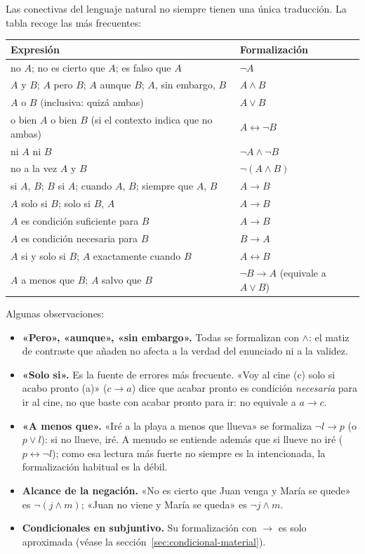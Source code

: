 Las conectivas del lenguaje natural no siempre tienen una única traducción. La tabla recoge las más frecuentes:
\begin{center}
\renewcommand{\arraystretch}{1.25}
\begin{tabular}{|p{9cm}|l|}
\hline
\textbf{Expresión} & \textbf{Formalización} \\
\hline
no $A$; no es cierto que $A$; es falso que $A$ & $\neg A$ \\
$A$ y $B$; $A$ pero $B$; $A$ aunque $B$; $A$, sin embargo, $B$ & $A \land B$ \\
$A$ o $B$ (inclusiva: quizá ambas) & $A \lor B$ \\
o bien $A$ o bien $B$ (si el contexto indica que no ambas) & $A \leftrightarrow \lnot B$ \\
ni $A$ ni $B$ & $\neg A \land \neg B$ \\
no a la vez $A$ y $B$ & $\neg(A \land B)$ \\
si $A$, $B$; $B$ si $A$; cuando $A$, $B$; siempre que $A$, $B$ & $A \to B$ \\
$A$ solo si $B$; solo si $B$, $A$ & $A \to B$ \\
$A$ es condición suficiente para $B$ & $A \to B$ \\
$A$ es condición necesaria para $B$ & $B \to A$ \\
$A$ si y solo si $B$; $A$ exactamente cuando $B$ & $A \leftrightarrow B$ \\
$A$ a menos que $B$; $A$ salvo que $B$ & $\neg B \to A$ \quad (equivale a $A \lor B$) \\
\hline
\end{tabular}
\end{center}

Algunas observaciones:
\begin{itemize}
    \item \textbf{«Pero», «aunque», «sin embargo».} Todas se formalizan con $\land$: el matiz de contraste que añaden no afecta a la verdad del enunciado ni a la validez.
    \item \textbf{«Solo si».} Es la fuente de errores más frecuente. «Voy al cine (c) solo si acabo pronto (a)» ($c \to a$) dice que acabar pronto es condición \emph{necesaria} para ir al cine, no que baste con acabar pronto para ir: no equivale a $a \to c$.
    \item \textbf{«A menos que».} «Iré a la playa a menos que llueva» se formaliza $\neg l \to p$ (o $p \lor l$): si no llueve, iré. A menudo se entiende además que si llueve no iré ($p \leftrightarrow \neg l$); como esa lectura más fuerte no siempre es la intencionada, la formalización habitual es la débil.
    \item \textbf{Alcance de la negación.} «No es cierto que Juan venga y María se quede» es $\neg(j \land m)$; «Juan no viene y María se queda» es $\neg j \land m$.
    \item \textbf{Condicionales en subjuntivo.} Su formalización con $\to$ es solo aproximada (véase la sección~\ref{sec:condicional-material}).
\end{itemize}

